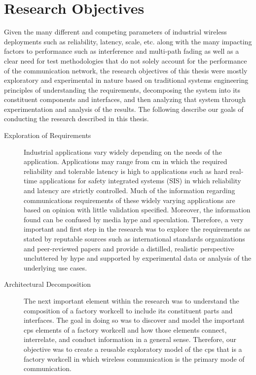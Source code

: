 {
	\color{blue}
\section{Research Objectives}

Given the many different and competing parameters of industrial wireless deployments such as reliability, latency, scale, etc. along with the many impacting factors to performance such as interference and multi-path fading as well as a clear need for test methodologies that do not solely account for the performance of the communication network, the research objectives of this thesis were mostly exploratory and experimental in nature based on traditional systems engineering principles of understanding the requirements, decomposing the system into its constituent components and interfaces, and then analyzing that system through experimentation and analysis of the results.  The following describe our goals of conducting the research described in this thesis.

\begin{description}
	\item[Exploration of Requirements] Industrial applications vary widely depending on the needs of the application.  Applications may range from \gls{cm} in which the required reliability and tolerable latency is high to applications such as hard real-time applications for safety integrated systems (SIS) in which reliability and latency are strictly controlled.  Much of the information regarding communications requirements of these widely varying applications are based on opinion with little validation specified.  Moreover, the information found can be confused by media hype and speculation.  Therefore, a very important and first step in the research was to explore the requirements as stated by reputable sources such as international standards organizations and peer-reviewed papers and provide a distilled, realistic perspective uncluttered by hype and supported by experimental data or analysis of the underlying use cases.
	
	\item[Architectural Decomposition] The next important element within the research was to understand the composition of a factory workcell to include its constituent parts and interfaces.  The goal in doing so was to discover and model the important \gls{cps} elements of a factory workcell and how those elements connect, interrelate, and conduct information in a general sense.  Therefore, our objective was to create a reusable exploratory model of the \gls{cps} that is a factory workcell in which wireless communication is the primary mode of communication.
	

\end{description}}
